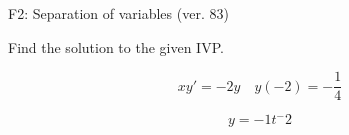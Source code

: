 \begin{exercise}
  \begin{exerciseTitle}F2: Separation of variables (ver. 83)\end{exerciseTitle}
  \begin{exerciseStatement}
    
Find the solution to the given IVP.

    
\[xy'= -2 y \hspace{1em} y( -2 ) = -\frac{1}{4}\]

  \end{exerciseStatement}
  \begin{exerciseAnswer}
    
\[y= -1 t^ -2\]

  \end{exerciseAnswer}
\end{exercise}